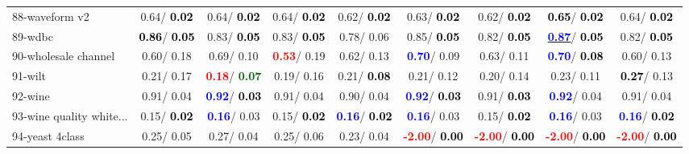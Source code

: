 \begin{table}[h]
\begin{center}
\begin{tabular}{lc|c|c|c|c|c|c|c}
88-waveform v2 &   0.64/\textcolor{black}{\textbf{  0.02}} &   0.64/\textcolor{black}{\textbf{  0.02}} &   0.64/\textcolor{black}{\textbf{  0.02}} &   0.62/\textcolor{black}{\textbf{  0.02}} &   0.63/\textcolor{black}{\textbf{  0.02}} &   0.62/\textcolor{black}{\textbf{  0.02}} & \textcolor{black}{\textbf{  0.65}}/\textcolor{black}{\textbf{  0.02}} &   0.64/\textcolor{black}{\textbf{  0.02}} \\
89-wdbc & \textcolor{black}{\textbf{  0.86}}/\textcolor{black}{\textbf{  0.05}} &   0.83/\textcolor{black}{\textbf{  0.05}} &   0.83/\textcolor{black}{\textbf{  0.05}} &   0.78/  0.06 &   0.85/\textcolor{black}{\textbf{  0.05}} &   0.82/\textcolor{black}{\textbf{  0.05}} & \underline{\textcolor{blue}{\textbf{  0.87}}}/\textcolor{black}{\textbf{  0.05}} &   0.82/\textcolor{black}{\textbf{  0.05}} \\
90-wholesale channel &   0.60/  0.18 &   0.69/  0.10 & \textcolor{red}{\textbf{  0.53}}/  0.19 &   0.62/  0.13 & \textcolor{blue}{\textbf{  0.70}}/  0.09 &   0.63/  0.11 & \textcolor{blue}{\textbf{  0.70}}/\textcolor{black}{\textbf{  0.08}} &   0.60/  0.13 \\
91-wilt &   0.21/  0.17 & \textcolor{red}{\textbf{  0.18}}/\textcolor{darkgreen}{\textbf{  0.07}} &   0.19/  0.16 &   0.21/\textcolor{black}{\textbf{  0.08}} &   0.21/  0.12 &   0.20/  0.14 &   0.23/  0.11 & \textcolor{black}{\textbf{  0.27}}/  0.13 \\
92-wine &   0.91/  0.04 & \textcolor{blue}{\textbf{  0.92}}/\textcolor{black}{\textbf{  0.03}} &   0.91/  0.04 &   0.90/  0.04 & \textcolor{blue}{\textbf{  0.92}}/\textcolor{black}{\textbf{  0.03}} &   0.91/\textcolor{black}{\textbf{  0.03}} & \textcolor{blue}{\textbf{  0.92}}/  0.04 &   0.91/  0.04 \\ \hline
93-wine quality white... &   0.15/\textcolor{black}{\textbf{  0.02}} & \textcolor{blue}{\textbf{  0.16}}/  0.03 &   0.15/\textcolor{black}{\textbf{  0.02}} & \textcolor{blue}{\textbf{  0.16}}/\textcolor{black}{\textbf{  0.02}} & \textcolor{blue}{\textbf{  0.16}}/  0.03 &   0.15/\textcolor{black}{\textbf{  0.02}} & \textcolor{blue}{\textbf{  0.16}}/  0.03 & \textcolor{blue}{\textbf{  0.16}}/\textcolor{black}{\textbf{  0.02}} \\
94-yeast 4class &   0.25/  0.05 &   0.27/  0.04 &   0.25/  0.06 &   0.23/  0.04 & \textcolor{red}{\textbf{ -2.00}}/\textcolor{black}{\textbf{  0.00}} & \textcolor{red}{\textbf{ -2.00}}/\textcolor{black}{\textbf{  0.00}} & \textcolor{red}{\textbf{ -2.00}}/\textcolor{black}{\textbf{  0.00}} & \textcolor{red}{\textbf{ -2.00}}/\textcolor{black}{\textbf{  0.00}} \\\end{tabular}\label{stratsALCKappa2bNB}
\end{center}
\end{table}
